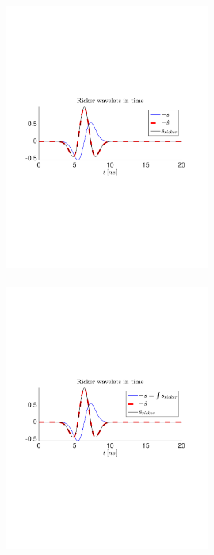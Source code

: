 \documentclass[a4paper,12pt]{article}
\begin{document}
\begin{figure}[!h]
\centering
\includegraphics[trim={60 280 60 280},clip,width=0.6\textwidth]{pics/ricker-time-formula.pdf}\\~\\
\includegraphics[trim={60 280 60 280},clip,width=0.6\textwidth]{pics/ricker-time-integral.pdf}\\~\\

\end{figure}
\end{document}
